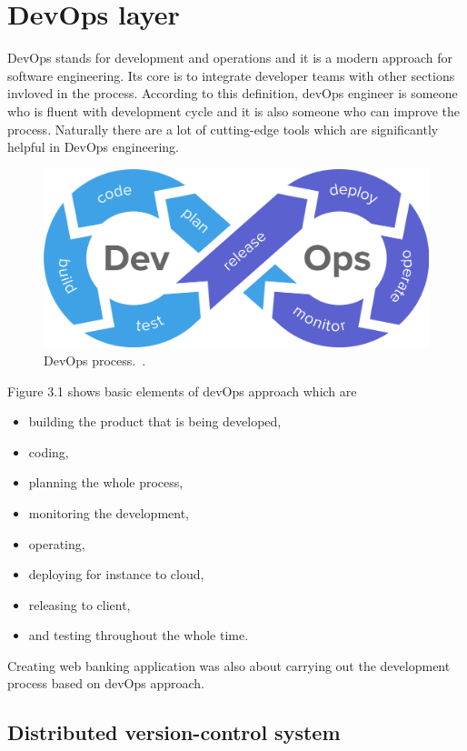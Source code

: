 \documentclass[a4paper,12pt]{book}
\newcommand\tab[1][1cm]{\hspace*{#1}}
\begin{document}
{{     
}

\chapter{DevOps layer}
{
\tab DevOps stands for development and operations and it is a modern approach for software engineering. Its core is to integrate developer teams with other sections invloved in the process. According to this definition, devOps engineer is someone who is fluent with development cycle and it is also someone who can improve the process. Naturally there are a lot of cutting-edge tools which are significantly helpful in DevOps engineering. 

\bigskip
\begin{figure}[h]
  \centering
    \includegraphics[width=1.0\textwidth]{devops}
    \caption{DevOps process.~\cite{devops}.}
\end{figure}
    
Figure 3.1 shows basic elements of devOps approach which are
\begin{itemize}
	\item building the product that is being developed,
	\item coding,
	\item planning the whole process,
	\item monitoring the development,
	\item operating,
	\item deploying for instance to cloud,
	\item releasing to client,
	\item and testing throughout the whole time.
\end{itemize} 
	
\bigskip
Creating web banking application was also about carrying out the development process based on devOps approach. 
}
\section{Distributed version-control system}}
\end{document}
